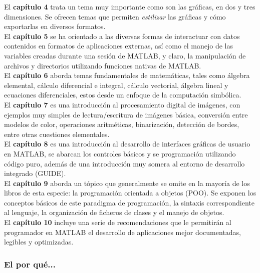 El \textbf{capítulo 4} trata un tema muy importante como son las
gráficas, en dos y tres dimensiones. Se ofrecen temas que permiten
\emph{estilizar} las gráficas y cómo exportarlas en diversos formatos. \\

El \textbf{capítulo 5} se ha orientado a las diversas formas de
interactuar con datos contenidos en formatos de aplicaciones externas,
así como el manejo de las variables creadas durante una sesión de
MATLAB, y claro, la manipulación de archivos y directorios utilizando
funciones nativas de MATLAB. \\

El \textbf{capítulo 6} aborda temas fundamentales de matemáticas, tales
como álgebra elemental, cálculo diferencial e integral, cálculo
vectorial, álgebra lineal y ecuaciones diferenciales, estos desde un
enfoque de la computación simbólica. \\

El \textbf{capítulo 7} es una introducción al procesamiento digital de
imágenes, con ejemplos muy simples de lectura/escritura de imágenes
básica, conversión entre modelos de color, operaciones aritméticas,
binarización, detección de bordes, entre otras cuestiones elementales. \\

El \textbf{capítulo 8} es una introducción al desarrollo de interfaces
gráficas de usuario en MATLAB, se abarcan los controles básicos y se
programación utilizando código puro, además de una introducción muy
somera al entorno de desarrollo integrado (GUIDE). \\

El \textbf{capítulo 9} aborda un tópico que generalmente se omite en la
mayoría de los libros de esta especie: la programación orientada a
objetos (POO). Se exponen los conceptos básicos de este paradigma de
programación, la sintaxis correspondiente al lenguaje, la organización
de ficheros de clases y el manejo de objetos. \\
 
El \textbf{capítulo 10} incluye una serie de recomendaciones que le
permitirán al programador en MATLAB el desarrollo de aplicaciones mejor
documentadas, legibles y optimizadas. \\

\subsubsection*{El por qué...}

